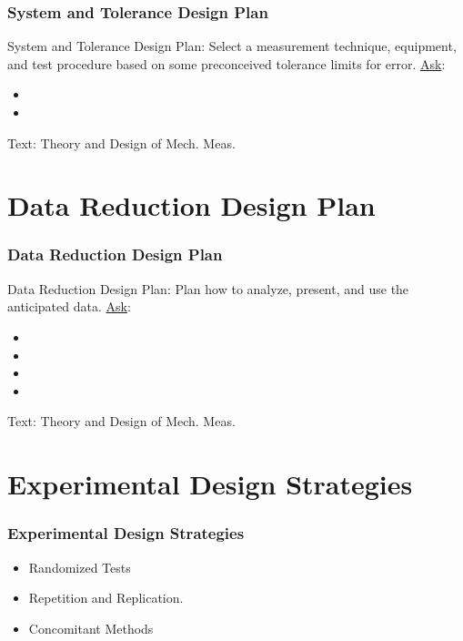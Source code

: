 \documentclass[fleqn]{beamer} %
\newcommand{\sectiontitleII}{System and Tolerance Design Plan}
\newcommand{\sectiontitleIII}{Data Reduction Design Plan}
\newcommand{\sectiontitleIV}{Experimental Design Strategies }
\begin{document}
\begin{frame}[label=sectionII]
\frametitle{\sectiontitleII}


{\PR System and Tolerance Design Plan}: Select a measurement technique, equipment, and
test procedure based on some preconceived tolerance limits for error. \vspc
\underline{Ask}:
\begin{itemize}
	\item 
	\item 
\end{itemize} 

{\tiny Text: Theory and Design of Mech. Meas.}
\end{frame}

\section{\sectiontitleIII}

\begin{frame}[label=sectionIII]
\frametitle{\sectiontitleIII}

{\GR Data Reduction Design Plan}: Plan how to analyze, present, and use the anticipated data.\vspc
\underline{Ask}:
\begin{itemize}
	\item 
	\item 
	\item 
	\item
\end{itemize} 

{\tiny Text: Theory and Design of Mech. Meas.}
\end{frame}

\section{\sectiontitleIV}

\begin{frame}[label=sectionIV]
\frametitle{\sectiontitleIV}


\begin{itemize}
	\item {\BL Randomized} Tests \vspccc%
	\item {\GR Repetition} and {\PR Replication}. \vspccc%
	\item {\BR Concomitant} Methods \vspccc
\end{itemize}

\end{frame}
\end{document}
